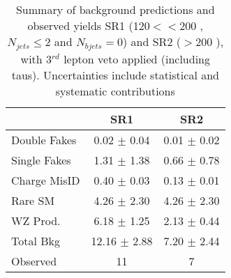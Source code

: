 \begin{table}[htb!]
  \begin{center}
    \caption{Summary of background predictions and observed yields SR1 (120$<$\MET$<$200 \GeV, $N_{jets} \leq 2$ and $N_{bjets} = 0$) and SR2 (\MET$>$200 \GeV), with 3$^{rd}$ lepton veto applied (including taus). Uncertainties include statistical and systematic contributions}
    \label{tab:SSYields}
    \vspace{0.3cm}
    \begin{tabular}{l||c|c}
      \hline \hline
               &      SR1          &   SR2             \\ \hline
Double Fakes   &  0.02 $\pm$  0.04 & 0.01 $\pm$  0.02 \\ 
Single Fakes   &  1.31 $\pm$  1.38 & 0.66 $\pm$  0.78 \\ 
Charge MisID   &  0.40 $\pm$  0.03 & 0.13 $\pm$  0.01 \\ 
Rare SM        &  4.26 $\pm$  2.30 & 4.26 $\pm$  2.30 \\ 
WZ Prod.       &  6.18 $\pm$  1.25 & 2.13 $\pm$  0.44 \\ \hline 
Total Bkg      & 12.16 $\pm$  2.88 & 7.20 $\pm$  2.44 \\ \hline 
Observed       & 11                &   7              \\ 

      \hline \hline
    \end{tabular}
  \end{center}
\end{table}
